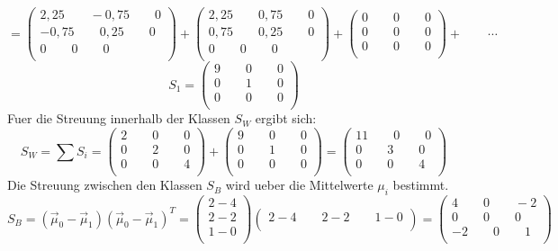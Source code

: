 \[
= 
\left(
\begin {array} {c}
2,25 \qquad -0,75 \qquad 0 \\
-0,75 \qquad 0,25 \qquad 0  \\
0 \qquad 0 \qquad 0  \\
\end {array}
\right)
+
\left(
\begin {array} {c}
2,25 \qquad 0,75 \qquad 0 \\
0,75 \qquad 0,25 \qquad 0  \\
0 \qquad 0 \qquad 0  \\
\end {array}
\right)
+
\left(
\begin {array} {c}
0 \qquad 0 \qquad 0  \\
0 \qquad 0 \qquad 0  \\
0 \qquad 0 \qquad 0  \\
\end {array}
\right)
+ \qquad \cdots
\]
\[
S_1 =
\left(
\begin {array} {c}
9 \qquad 0 \qquad 0  \\
0 \qquad 1 \qquad 0  \\
0 \qquad 0 \qquad 0  \\
\end {array}
\right)
\]
Fuer die Streuung innerhalb der Klassen $S_W$ ergibt sich:
\[
S_W = \sum{S_i} = 
\left(
\begin {array} {c}
2 \qquad 0 \qquad 0  \\
0 \qquad 2 \qquad 0  \\
0 \qquad 0 \qquad 4  \\
\end {array}
\right)
+
\left(
\begin {array} {c}
9 \qquad 0 \qquad 0  \\
0 \qquad 1 \qquad 0  \\
0 \qquad 0 \qquad 0  \\
\end {array}
\right)
=
\left(
\begin {array} {c}
11 \qquad 0 \qquad 0  \\
0 \qquad 3 \qquad 0  \\
0 \qquad 0 \qquad 4  \\
\end {array}
\right)
\]
Die Streuung zwischen den Klassen $S_B$ wird ueber die Mittelwerte $\mu_i$ bestimmt.
\[
S_B = (\vec{\mu}_0 - \vec{\mu}_1)(\vec{\mu}_0 - \vec{\mu}_1)^T = 
\left(
\begin {array} {c}
2 - 4 \\
2 - 2 \\
1 - 0 \\
\end {array}
\right)
\left(
\begin {array} {c}
2 - 4 \qquad 2 - 2 \qquad 1 - 0 \\
\end {array}
\right)
=
\left(
\begin {array} {c}
4 \qquad 0 \qquad -2  \\
0 \qquad 0 \qquad 0  \\
-2 \qquad 0 \qquad 1  \\
\end {array}
\right)
\]
